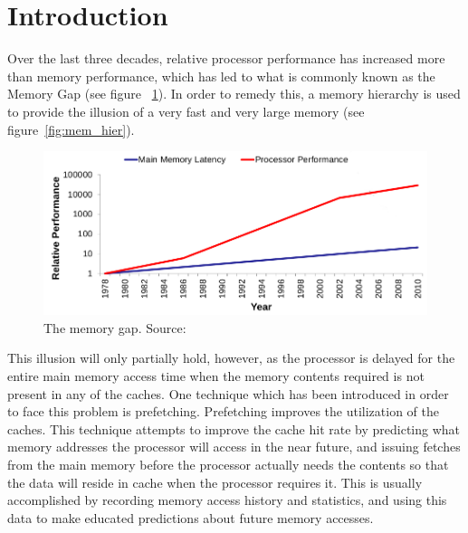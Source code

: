 
\section{Introduction}
\label{sec:introduction}
Over the last three decades, relative processor performance has increased more than memory performance,
which has led to what is commonly known as the Memory Gap (see figure ~\ref{fig:mem_gap}). In order to remedy this, a memory
hierarchy is used to provide the illusion of a very fast and very
large memory (see figure~\ref{fig:mem_hier}). \cite{tdt4260lect} 

\begin{figure}[H]
	\centering
	\includegraphics[scale=0.27]{./figures/memwall}
	\caption{The memory gap. Source:\cite{tdt4260lect}}
	\label{fig:mem_gap}
\end{figure}

This illusion will only partially hold, however, as the processor is
delayed for the entire main memory access time when the memory contents required
is not present in any of the caches. One technique
which has been introduced in order to face this problem is prefetching. Prefetching improves the utilization of the caches. This technique
attempts to improve the cache hit rate by predicting what memory
addresses the processor will access in the near future, and
issuing fetches from the main memory before the processor actually
needs the contents so that the data will reside in cache when the
processor requires it. This is usually accomplished by recording
memory access history and statistics, and using this data to make educated
predictions about future memory accesses.\cite{Grannas} 

